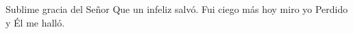 Sublime gracia del Señor 
Que un infeliz salvó. 
Fui ciego más hoy miro yo 
Perdido y Él me halló. 
